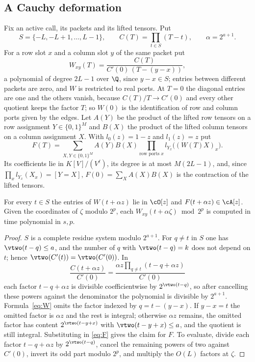\subsection{A Cauchy deformation}\label{app:cauchy}
Fix an active call, its packets and its lifted tensors. Put
\[
S=\{-L,-L+1,\dots,L-1\},\qquad C(T)=\prod_{t\in S}(T-t),\qquad \alpha=2^{a+1}.
\]
For a row slot $x$ and a column slot $y$ of the same packet put
\begin{equation}\label{eq:W}
W_{xy}(T)=\frac{C(T)}{C'(0)\,(T-(y-x))},
\end{equation}
a polynomial of degree $2L-1$ over $\Q$, since $y-x\in S$; entries between
different packets are zero, and $W$ is restricted to real ports. At $T=0$ the
diagonal entries are one and the others vanish, because $C(T)/T\to C'(0)$ and
every other quotient keeps the factor $T$; so $W(0)$ is the identification of
row and column ports given by the edges. Let $A(Y)$ be the product of the
lifted row tensors on a row assignment $Y\in\{0,1\}^M$ and $B(X)$ the product of
the lifted column tensors on a column assignment $X$. With $l_0(z)=1-z$ and
$l_1(z)=z$ put
\begin{equation}\label{eq:F}
F(T)=\sum_{X,Y\in\{0,1\}^M}A(Y)B(X)\prod_{\text{row ports }x}l_{Y_x}\bigl((W(T)X)_x\bigr).
\end{equation}
Its coefficients lie in $K[V]/(V^\ell)$, its degree is at most $M(2L-1)$, and,
since $\prod_xl_{Y_x}(X_x)=[Y=X]$, $F(0)=\sum_XA(X)B(X)$ is the contraction of the
lifted tensors.

\begin{lemma}[Integrality]\label{lem:integral}
For every $t\in S$ the entries of $W(t+\alpha z)$ lie in $\cO[z]$ and
$F(t+\alpha z)\in\cA[z]$. Given the coordinates of $\zeta$ modulo $2^p$, each
$W_{xy}(t+\alpha\zeta)\bmod2^p$ is computed in time polynomial in $s,p$.
\end{lemma}

\begin{proof}
$S$ is a complete residue system modulo $2^{a+1}$. For $q\ne t$ in $S$ one has
$\vtwo(t-q)\le a$, and the number of $q$ with $\vtwo(t-q)=k$ does not depend on
$t$; hence $\vtwo(C'(t))=\vtwo(C'(0))$. In
\[
\frac{C(t+\alpha z)}{C'(0)}=\frac{\alpha z\prod_{q\ne t}(t-q+\alpha z)}{C'(0)}
\]
each factor $t-q+\alpha z$ is divisible coefficientwise by $2^{\vtwo(t-q)}$, so
after cancelling these powers against the denominator the polynomial is
divisible by $2^{a+1}$. Formula~\eqref{eq:W} omits the factor indexed by
$q=t-(y-x)$. If $y-x=t$ the omitted factor is $\alpha z$ and the rest is
integral; otherwise $\alpha z$ remains, the omitted factor has content
$2^{\vtwo(t-y+x)}$ with $\vtwo(t-y+x)\le a$, and the quotient is still
integral. Substituting in \eqref{eq:F} gives the claim for $F$. To evaluate,
divide each factor $t-q+\alpha z$ by $2^{\vtwo(t-q)}$, cancel the remaining
powers of two against $C'(0)$, invert its odd part modulo $2^p$, and multiply
the $O(L)$ factors at $\zeta$.
\end{proof}

